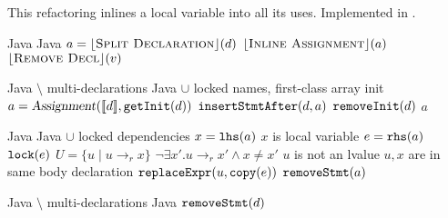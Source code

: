 \subsection{}
This refactoring inlines a local variable into all its uses. Implemented in .

\begin{algorithm}
\caption{$\refactoring{Inline Temp}(d : \type{LocalVarDecl})$}
\begin{algorithmic}[1]
\REQUIRE Java
\ENSURE Java
\medskip
\STATE $a = \lfloor\textsc{Split Declaration}\rfloor(d)$
\STATE $\lfloor\textsc{Inline Assignment}\rfloor(a)$
\STATE $\lfloor\textsc{Remove Decl}\rfloor(v)$
\end{algorithmic}
\end{algorithm}

\begin{algorithm}
\caption{$\refactoring{Split Declaration}(d : \type{LocalVarDecl}) : \type{Assignment}$}
\begin{algorithmic}[1]
\REQUIRE Java $\setminus$ multi-declarations
\ENSURE Java $\cup$ locked names, first-class array init
\medskip
\STATE $a = \text{\textsl{Assignment}}(\llbracket d\rrbracket, \text{\texttt{getInit}}(d))$  
\STATE $\text{\texttt{insertStmtAfter}}(d, a)$
\STATE $\text{\texttt{removeInit}}(d)$
\RETURN $a$
\end{algorithmic}
\end{algorithm}

\begin{algorithm}
\caption{$\refactoring{Inline Assignment}(a : \type{Assignment})$}
\begin{algorithmic}[1]
\REQUIRE Java
\ENSURE Java $\cup$ locked dependencies
\medskip
\STATE $x = \text{\texttt{lhs}}(a)$
\STATE \assert $x$ is local variable
\STATE $e = \text{\texttt{rhs}}(a)$
\STATE $\text{\texttt{lock}}(e)$
\STATE $U = \{ u \mid u\rightarrow_r x\}$
  \STATE \assert $\neg\exists x'.u\rightarrow_r x' \wedge x\neq x'$
  \STATE \assert $u$ is not an lvalue
  \STATE \assert $u,x$ are in same body declaration
  \STATE $\text{\texttt{replaceExpr}}(u, \text{\texttt{copy}}(e))$
\ENDFOR
{}
  \STATE $\text{\texttt{removeStmt}}(a)$
\ENDIF
\end{algorithmic}
\end{algorithm}

\begin{algorithm}
\caption{$\refactoring{Remove Decl}(d : \type{LocalVarDecl})$}
\begin{algorithmic}[1]
\REQUIRE Java $\setminus$ multi-declarations
\ENSURE Java
\medskip
{}
  \STATE $\text{\texttt{removeStmt}}(d)$
\ENDIF
\end{algorithmic}
\end{algorithm}
